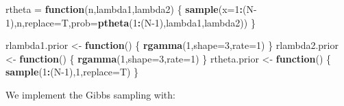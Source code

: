 \documentclass[
  11pt,
]{article}
\newenvironment{Shaded}{\begin{snugshade}}{\end{snugshade}}
\newcommand{\AttributeTok}[1]{\textcolor[rgb]{0.13,0.29,0.53}{#1}}
\newcommand{\ControlFlowTok}[1]{\textcolor[rgb]{0.13,0.29,0.53}{\textbf{#1}}}
\newcommand{\DecValTok}[1]{\textcolor[rgb]{0.00,0.00,0.81}{#1}}
\newcommand{\FunctionTok}[1]{\textcolor[rgb]{0.13,0.29,0.53}{\textbf{#1}}}
\newcommand{\NormalTok}[1]{#1}
\newcommand{\OtherTok}[1]{\textcolor[rgb]{0.56,0.35,0.01}{#1}}
\newcommand{\SpecialCharTok}[1]{\textcolor[rgb]{0.81,0.36,0.00}{\textbf{#1}}}
\begin{document}
\begin{Shaded}
\begin{Highlighting}[]
\NormalTok{rtheta }\OtherTok{=} \ControlFlowTok{function}\NormalTok{(n,lambda1,lambda2)}
\NormalTok{\{ }
  \FunctionTok{sample}\NormalTok{(}\AttributeTok{x=}\DecValTok{1}\SpecialCharTok{:}\NormalTok{(N}\DecValTok{{-}1}\NormalTok{),n,}\AttributeTok{replace=}\NormalTok{T,}\AttributeTok{prob=}\FunctionTok{ptheta}\NormalTok{(}\DecValTok{1}\SpecialCharTok{:}\NormalTok{(N}\DecValTok{{-}1}\NormalTok{),lambda1,lambda2)) }
\NormalTok{\}}

\NormalTok{rlambda1.prior }\OtherTok{\textless{}{-}} \ControlFlowTok{function}\NormalTok{() \{ }\FunctionTok{rgamma}\NormalTok{(}\DecValTok{1}\NormalTok{,}\AttributeTok{shape=}\DecValTok{3}\NormalTok{,}\AttributeTok{rate=}\DecValTok{1}\NormalTok{) \}}
\NormalTok{rlambda2.prior }\OtherTok{\textless{}{-}} \ControlFlowTok{function}\NormalTok{() \{ }\FunctionTok{rgamma}\NormalTok{(}\DecValTok{1}\NormalTok{,}\AttributeTok{shape=}\DecValTok{3}\NormalTok{,}\AttributeTok{rate=}\DecValTok{1}\NormalTok{) \}}
\NormalTok{rtheta.prior }\OtherTok{\textless{}{-}} \ControlFlowTok{function}\NormalTok{() \{ }\FunctionTok{sample}\NormalTok{(}\DecValTok{1}\SpecialCharTok{:}\NormalTok{(N}\DecValTok{{-}1}\NormalTok{),}\DecValTok{1}\NormalTok{,}\AttributeTok{replace=}\NormalTok{T) \}}
\end{Highlighting}
\end{Shaded}

We implement the Gibbs sampling with:
\end{document}
